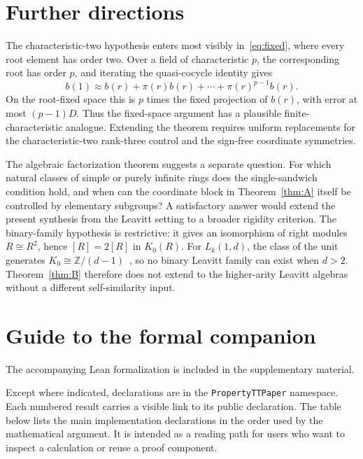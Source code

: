 \documentclass[11pt]{amsart}
\newif\ifanonymous\anonymoustrue
\newcommand{\leanrepo}{[repository link removed for anonymous review]}
\newcommand{\leanrepo}{https://github.com/SauersML/group-approximation}
\theoremstyle{definition}
\theoremstyle{plain}
\begin{document}
\section{Further directions}\label{sec:directions}

The characteristic-two hypothesis enters most visibly
in~\eqref{eq:fixed}, where every root element has order two.  Over a
field of characteristic \(p\), the corresponding root has order
\(p\), and iterating the quasi-cocycle identity gives
\[
  b(1)\approx
  b(r)+\pi(r)b(r)+\cdots+\pi(r)^{p-1}b(r).
\]
On the root-fixed space this is \(p\) times the fixed projection of
\(b(r)\), with error at most \((p-1)D\).  Thus the fixed-space
argument has a plausible finite-characteristic analogue.  Extending
the theorem requires uniform replacements for the
characteristic-two rank-three control and the sign-free coordinate
symmetries.

The algebraic factorization theorem suggests a separate question.
For which natural classes of simple or purely infinite rings does
the single-sandwich condition hold, and when can the coordinate
block in Theorem~\ref{thm:A} itself be controlled by elementary
subgroups?  A satisfactory answer would extend the present
synthesis from the Leavitt setting to a broader rigidity criterion.
The binary-family hypothesis is restrictive: it gives an isomorphism
of right modules \(R\cong R^2\), hence \([R]=2[R]\) in \(K_0(R)\).
For \(L_k(1,d)\), the class of the unit generates
\(K_0\cong\mathbb Z/(d-1)\)~\cite{AraBrustengaCortinas}, so no binary Leavitt family can exist
when \(d>2\).  Theorem~\ref{thm:B} therefore does not extend to the
higher-arity Leavitt algebras without a different self-similarity
input.

\appendix
\section{Guide to the formal companion}\label{app:formal}

\ifanonymous
The accompanying Lean formalization is included in the supplementary
material.
\else
The accompanying Lean formalization is available in the
\href{\leanrepo}{project repository}.
\fi
Except where indicated, declarations are in the
\nolinkurl{PropertyTTPaper} namespace.
Each numbered result carries a visible link to its public declaration.
The table below lists the main implementation declarations in the
order used by the mathematical argument.  It is intended as a reading
path for users who want to inspect a calculation or reuse a proof
component.
\end{document}
